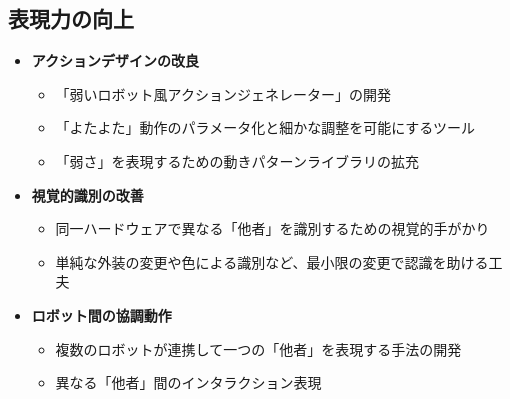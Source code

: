 \documentclass{cuxarticle}
\begin{document}
\subsection{表現力の向上}
\begin{itemize}
  \item \textbf{アクションデザインの改良}
    \begin{itemize}
      \item 「弱いロボット風アクションジェネレーター」の開発
      \item 「よたよた」動作のパラメータ化と細かな調整を可能にするツール
      \item 「弱さ」を表現するための動きパターンライブラリの拡充
    \end{itemize}

  \item \textbf{視覚的識別の改善}
    \begin{itemize}
      \item 同一ハードウェアで異なる「他者」を識別するための視覚的手がかり
      \item 単純な外装の変更や色による識別など、最小限の変更で認識を助ける工夫
    \end{itemize}

  \item \textbf{ロボット間の協調動作}
    \begin{itemize}
      \item 複数のロボットが連携して一つの「他者」を表現する手法の開発
      \item 異なる「他者」間のインタラクション表現
    \end{itemize}
\end{itemize}
\end{document}

